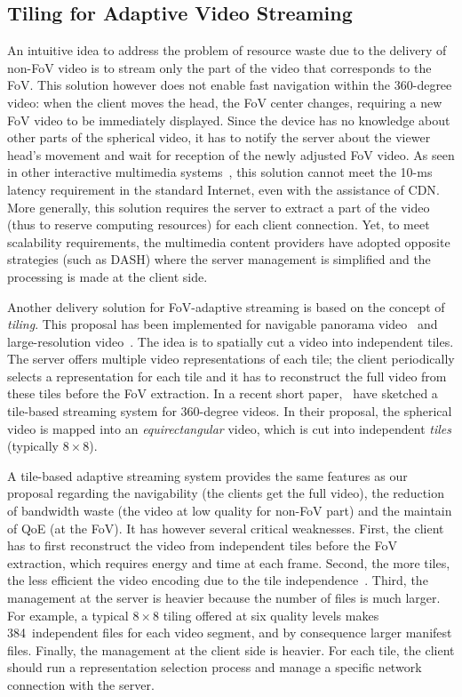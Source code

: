 \subsection{Tiling for Adaptive Video Streaming}

An intuitive idea to address the problem of resource waste due to the delivery of non-FoV video
is to stream only the part of the video that corresponds to the \ac{FoV}. This solution however
does not enable fast navigation within the 360-degree video: when the client moves the head, 
the FoV
center changes, requiring a new FoV video to be immediately displayed. Since
the device has no knowledge about other parts of the spherical video, it has to notify
the server about the viewer head's movement and wait for reception of the newly
adjusted FoV video. As seen in other interactive multimedia systems~\cite{ChoyWSR14},
this solution cannot meet the 10-ms latency requirement in the standard Internet, even 
with the assistance of \ac{CDN}. More generally, this solution requires the server to extract
a part of the video (thus to reserve computing resources) for each 
client connection. Yet, to
meet scalability requirements, the multimedia content providers have adopted opposite 
strategies (such as \ac{DASH}) where the server management is simplified and the 
processing is made at the client side.

Another delivery solution for \ac{FoV}-adaptive streaming is based on the concept of \emph{tiling}.
This proposal has been implemented for navigable panorama
video~\cite{sanchez_compressed_2015,wang_mixing_2014,gaddam_tiling_2015} and 
large-resolution video~\cite{jean16mmsys}.
The idea is to spatially cut a video into independent tiles. The server offers 
multiple video representations of each tile; the client periodically selects a representation 
for each tile 
and it has to reconstruct
the full video from these tiles before the \ac{FoV} extraction. In a recent short 
paper,~\citet{ochi_live_2015} have sketched a tile-based streaming system for 360-degree 
videos.
In their proposal, the spherical video is mapped into an \emph{equirectangular} video, which
is cut into independent \emph{tiles} (typically $8\times 8$).

A tile-based adaptive streaming
system provides the same features as our proposal regarding the navigability (the clients 
get the full video), the reduction of bandwidth 
waste (the video at low quality for non-\ac{FoV} part) and the maintain of \ac{QoE} (at the 
FoV). It has however several critical weaknesses. First, the client has to first reconstruct
the video from independent tiles before the FoV extraction, which requires energy and 
time at each frame. Second, the more tiles, the less efficient the video encoding due to the
tile independence~\cite{sanchez_compressed_2015}. Third, the management at the server is
heavier because the number of files 
is much larger. For example, a typical $8\times8$ tiling offered at six quality levels makes 
384~independent files for each video segment, and by consequence larger manifest files.
Finally, the management at the client side is heavier. For each tile, the client should run
a representation selection process 
and manage a specific network connection with the server.

